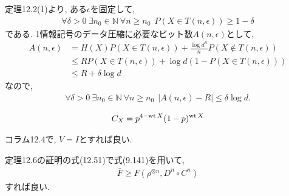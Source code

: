 \begin{ex}
    \label{ex12.5}
    定理12.2(1)より, ある$\epsilon$を固定して,
    \begin{align*}
        \forall \delta > 0 \ \exists n_0 \in \mathbb{N} \ \forall n \ge n_0 \ \ P\left( X \in T(n, \epsilon) \right) \ge 1 - \delta
    \end{align*}
    である. 1情報記号のデータ圧縮に必要なビット数$A(n, \epsilon)$として,
    \begin{align*}
        A(n,\epsilon) & =
        H(X) P \left(X \in T(n,\epsilon) \right) + \frac{\log d^n}{n} P \left(X \notin T(n,\epsilon) \right)
        \\
                      & \le
        R  P \left(X \in T(n,\epsilon) \right) + \log d \left(1 - P \left(X \in T(n,\epsilon) \right)\right)
        \\
                      & \le
        R + \delta \log d
    \end{align*}
    なので,
    \begin{align*}
        \forall \delta > 0 \ \exists n_0 \in \mathbb{N} \ \forall n \ge n_0 \ \ |A(n,\epsilon)-R| \le \delta \log d.
    \end{align*}
\end{ex}

\begin{ex}
    \label{ex12.6}
    \begin{align*}
        C_X = p^{4 - \operatorname{wt}{X}} (1-p)^{\operatorname{wt}{X}}
    \end{align*}
\end{ex}

\begin{ex}
    \label{ex12.7}
    コラム12.4で, $V=I$とすれば良い.
\end{ex}

\begin{ex}
    \label{ex12.8}
    定理12.6の証明の式(12.51)で式(9.141)を用いて,
    \begin{align*}
        \bar{F} \ge F\left( \rho^{\otimes n}, D^n \circ C^n\right)
    \end{align*}
    すれば良い.
\end{ex}

